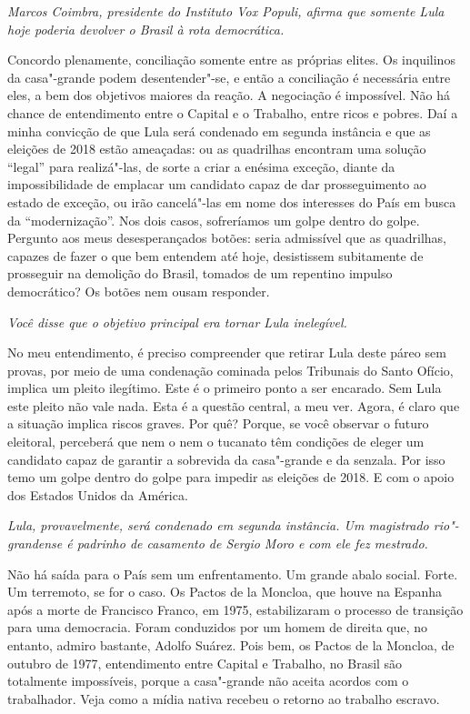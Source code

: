 \itshape
 Marcos Coimbra, presidente do Instituto Vox Populi,
afirma que somente Lula hoje poderia devolver o Brasil à rota
democrática.

\normalfont
Concordo plenamente, conciliação somente entre as
próprias elites. Os inquilinos da casa"-grande podem desentender"-se, e
então a conciliação é necessária entre eles, a bem dos objetivos maiores
da reação. A negociação é impossível. Não há chance de entendimento
entre o Capital e o Trabalho, entre ricos e pobres. Daí a minha
convicção de que Lula será condenado em segunda instância e que as
eleições de 2018 estão ameaçadas: ou as quadrilhas encontram uma solução
``legal'' para realizá"-las, de sorte a criar a enésima exceção, diante
da impossibilidade de emplacar um candidato capaz de dar prosseguimento
ao estado de exceção, ou irão cancelá"-las em nome dos interesses do País
em busca da ``modernização''. Nos dois casos, sofreríamos um golpe
dentro do golpe. Pergunto aos meus desesperançados botões: seria
admissível que as quadrilhas, capazes de fazer o que bem entendem até
hoje, desistissem subitamente de prosseguir na demolição do Brasil,
tomados de um repentino impulso democrático? Os botões nem ousam
responder.

\itshape
 Você disse que o objetivo principal era tornar Lula
inelegível.

\normalfont
No meu entendimento, é preciso compreender que retirar
Lula deste páreo sem provas, por meio de uma condenação cominada pelos
Tribunais do Santo Ofício, implica um pleito ilegítimo. Este é o
primeiro ponto a ser encarado. Sem Lula este pleito não vale nada. Esta
é a questão central, a meu ver. Agora, é claro que a situação implica
riscos graves. Por quê? Porque, se você observar o futuro eleitoral,
perceberá que nem o  nem o tucanato têm condições de eleger um
candidato capaz de garantir a sobrevida da casa"-grande e da senzala. Por
isso temo um golpe dentro do golpe para impedir as eleições de 2018. E
com o apoio dos Estados Unidos da América.

\itshape
 Lula, provavelmente, será condenado em segunda
instância. Um magistrado rio"-grandense é padrinho de casamento de Sergio
Moro e com ele fez mestrado.

\normalfont
Não há saída para o País sem um enfrentamento. Um grande
abalo social. Forte. Um terremoto, se for o caso. Os Pactos de la
Moncloa, que houve na Espanha após a morte de Francisco Franco, em 1975,
estabilizaram o processo de transição para uma democracia. Foram
conduzidos por um homem de direita que, no entanto, admiro bastante,
Adolfo Suárez. Pois bem, os Pactos de la Moncloa, de outubro de 1977,
entendimento entre Capital e Trabalho, no Brasil são totalmente
impossíveis, porque a casa"-grande não aceita acordos com o trabalhador.
Veja como a mídia nativa recebeu o retorno ao trabalho escravo.

